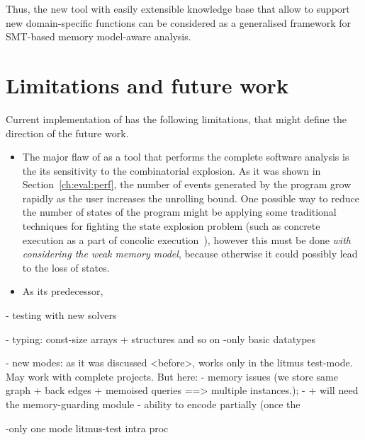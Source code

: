 Thus, the new tool \porthos[2] with easily extensible knowledge base that allow to support new domain-specific functions can be considered as a generalised framework for SMT-based memory model-aware analysis.



\section{Limitations and future work}

Current implementation of \porthos[2] has the following limitations, that might define the direction of the future work.

\begin{itemize}
\item The major flaw of \porthos[2] as a tool that performs the complete software analysis is the its sensitivity to the combinatorial explosion.
As it was shown in Section~\ref{ch:eval:perf}, the number of events generated by the program grow rapidly as the user increases the unrolling bound.
One possible way to reduce the number of states of the program might be applying some traditional techniques for fighting the state explosion problem (such as concrete execution as a part of concolic execution~\cite{majumdar2007hybrid}), however this must be done \textit{with considering the weak memory model}, because otherwise it could possibly lead to the loss of states.


\item As its predecessor, \porthos[2] 

\end{itemize}

- testing with new solvers

- typing: const-size arrays + structures and so on
  -only basic datatypes


- new modes: as it was discussed <before>, works only in the litmus test-mode. May work with complete projects. But here: 
  - memory issues (we store same graph + back edges + memoised queries ==> multiple instances.);
    - + will need the memory-guarding module
  - ability to encode partially (once the 

-only one mode litmus-test intra proc

